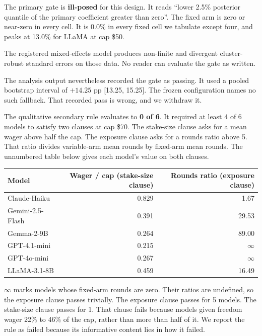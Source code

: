The primary gate is \textbf{ill-posed} for this design. It reads ``lower 2.5\% posterior quantile
of the primary coefficient greater than zero''. The fixed arm is zero or near-zero in every cell.
It is 0.0\% in every fixed cell we tabulate except four, and peaks at 13.0\% for LLaMA at cap
\$50.

The registered mixed-effects model produces non-finite and divergent cluster-robust standard
errors on those data. No reader can evaluate the gate as written.

The analysis output nevertheless recorded the gate as passing. It used a pooled bootstrap interval
of $+14.25$ pp [13.25, 15.25]. The frozen configuration names no such fallback. That recorded pass
is wrong, and we withdraw it.

The qualitative secondary rule evaluates to \textbf{0 of 6}. It required at least 4 of 6 models
to satisfy two clauses at cap \$70. The stake-size clause asks for a mean wager above half the
cap. The exposure clause asks for a rounds ratio above 5. That ratio divides variable-arm mean
rounds by fixed-arm mean rounds. The unnumbered table below gives each model's value on both
clauses.

\begin{center}
\small
\begin{tabular}{lrr}
\toprule
\textbf{Model} & \textbf{Wager / cap (stake-size clause)} & \textbf{Rounds ratio (exposure clause)} \\
\midrule
Claude-Haiku     & 0.829 & 1.67 \\
Gemini-2.5-Flash & 0.391 & 29.53 \\
Gemma-2-9B       & 0.264 & 89.00 \\
GPT-4.1-mini     & 0.215 & $\infty$ \\
GPT-4o-mini      & 0.267 & $\infty$ \\
LLaMA-3.1-8B     & 0.459 & 16.49 \\
\bottomrule
\end{tabular}
\end{center}

\noindent
$\infty$ marks models whose fixed-arm rounds are zero. Their ratios are undefined, so the
exposure clause passes trivially. The exposure clause passes for 5 models. The stake-size clause
passes for 1. That clause fails because models given freedom wager 22\% to 46\% of the cap, rather
than more than half of it. We report the rule as failed because its informative content lies in
how it failed.

